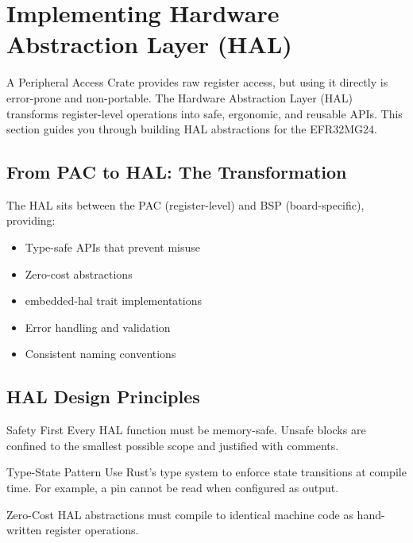 
\section{Implementing Hardware Abstraction Layer (HAL)}
\label{sec:hal-implementation}

A Peripheral Access Crate provides raw register access, but using it directly is error-prone and non-portable. The Hardware Abstraction Layer (HAL) transforms register-level operations into safe, ergonomic, and reusable APIs. This section guides you through building HAL abstractions for the EFR32MG24.

\subsection{From PAC to HAL: The Transformation}
\label{subsec:pac-to-hal}

The HAL sits between the PAC (register-level) and BSP (board-specific), providing:

\begin{itemize}
    \item Type-safe APIs that prevent misuse
    \item Zero-cost abstractions
    \item embedded-hal trait implementations
    \item Error handling and validation
    \item Consistent naming conventions
\end{itemize}

\subsection{HAL Design Principles}
\label{subsec:hal-design-principles}

\begin{designprinciple}{Safety First}
    Every HAL function must be memory-safe. Unsafe blocks are confined to the smallest possible scope and justified with comments.
\end{designprinciple}

\begin{designprinciple}{Type-State Pattern}
    Use Rust's type system to enforce state transitions at compile time. For example, a pin cannot be read when configured as output.
\end{designprinciple}

\begin{designprinciple}{Zero-Cost}
    HAL abstractions must compile to identical machine code as hand-written register operations.
\end{designprinciple}

